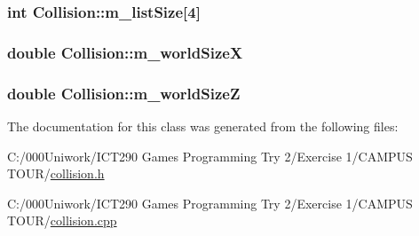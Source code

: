 \subsubsection[{\texorpdfstring{m\+\_\+list\+Size}{m_listSize}}]{\setlength{\rightskip}{0pt plus 5cm}int Collision\+::m\+\_\+list\+Size\mbox{[}4\mbox{]}\hspace{0.3cm}{\ttfamily [private]}}\hypertarget{class_collision_a672db5b63f40954a5c7ddc2077dcd0dd}{}\label{class_collision_a672db5b63f40954a5c7ddc2077dcd0dd}
\subsubsection[{\texorpdfstring{m\+\_\+world\+SizeX}{m_worldSizeX}}]{\setlength{\rightskip}{0pt plus 5cm}double Collision\+::m\+\_\+world\+SizeX\hspace{0.3cm}{\ttfamily [private]}}\hypertarget{class_collision_a623ab40059b558aee3a4d7ec9f36e584}{}\label{class_collision_a623ab40059b558aee3a4d7ec9f36e584}
\subsubsection[{\texorpdfstring{m\+\_\+world\+SizeZ}{m_worldSizeZ}}]{\setlength{\rightskip}{0pt plus 5cm}double Collision\+::m\+\_\+world\+SizeZ\hspace{0.3cm}{\ttfamily [private]}}\hypertarget{class_collision_a1a38403384262f9817e46e125e77601b}{}\label{class_collision_a1a38403384262f9817e46e125e77601b}


The documentation for this class was generated from the following files\+:\begin{DoxyCompactItemize}
\item 
C\+:/000\+Uniwork/\+I\+C\+T290 Games Programming Try 2/\+Exercise 1/\+C\+A\+M\+P\+U\+S T\+O\+U\+R/\hyperlink{collision_8h}{collision.\+h}\item 
C\+:/000\+Uniwork/\+I\+C\+T290 Games Programming Try 2/\+Exercise 1/\+C\+A\+M\+P\+U\+S T\+O\+U\+R/\hyperlink{collision_8cpp}{collision.\+cpp}\end{DoxyCompactItemize}
